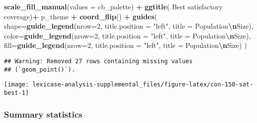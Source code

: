 \documentclass[
]{book}
\newenvironment{Shaded}{\begin{snugshade}}{\end{snugshade}}
\newcommand{\AttributeTok}[1]{\textcolor[rgb]{0.13,0.29,0.53}{#1}}
\newcommand{\DecValTok}[1]{\textcolor[rgb]{0.00,0.00,0.81}{#1}}
\newcommand{\FunctionTok}[1]{\textcolor[rgb]{0.13,0.29,0.53}{\textbf{#1}}}
\newcommand{\NormalTok}[1]{#1}
\newcommand{\SpecialCharTok}[1]{\textcolor[rgb]{0.81,0.36,0.00}{\textbf{#1}}}
\newcommand{\StringTok}[1]{\textcolor[rgb]{0.31,0.60,0.02}{#1}}
\begin{document}
\begin{Shaded}
\begin{Highlighting}[]
  \FunctionTok{scale\_fill\_manual}\NormalTok{(}\AttributeTok{values =}\NormalTok{ cb\_palette) }\SpecialCharTok{+}
  \FunctionTok{ggtitle}\NormalTok{(}\StringTok{\textquotesingle{}  Best satisfactory coverage\textquotesingle{}}\NormalTok{)}\SpecialCharTok{+}
\NormalTok{  p\_theme }\SpecialCharTok{+} \FunctionTok{coord\_flip}\NormalTok{() }\SpecialCharTok{+}
  \FunctionTok{guides}\NormalTok{(}
    \AttributeTok{shape=}\FunctionTok{guide\_legend}\NormalTok{(}\AttributeTok{nrow=}\DecValTok{2}\NormalTok{, }\AttributeTok{title.position =} \StringTok{"left"}\NormalTok{, }\AttributeTok{title =} \StringTok{\textquotesingle{}Population}\SpecialCharTok{\textbackslash{}n}\StringTok{Size\textquotesingle{}}\NormalTok{),}
    \AttributeTok{color=}\FunctionTok{guide\_legend}\NormalTok{(}\AttributeTok{nrow=}\DecValTok{2}\NormalTok{, }\AttributeTok{title.position =} \StringTok{"left"}\NormalTok{, }\AttributeTok{title =} \StringTok{\textquotesingle{}Population}\SpecialCharTok{\textbackslash{}n}\StringTok{Size\textquotesingle{}}\NormalTok{),}
    \AttributeTok{fill=}\FunctionTok{guide\_legend}\NormalTok{(}\AttributeTok{nrow=}\DecValTok{2}\NormalTok{, }\AttributeTok{title.position =} \StringTok{"left"}\NormalTok{, }\AttributeTok{title =} \StringTok{\textquotesingle{}Population}\SpecialCharTok{\textbackslash{}n}\StringTok{Size\textquotesingle{}}\NormalTok{)}
\NormalTok{  )}
\end{Highlighting}
\end{Shaded}

\begin{verbatim}
## Warning: Removed 27 rows containing missing values
## (`geom_point()`).
\end{verbatim}

\texttt{[image: lexicase-analysis-supplemental\_files/figure-latex/con-150-sat-best-1]}

\hypertarget{summary-statistics-2}{%
\subsubsection{Summary statistics}\label{summary-statistics-2}}
\end{document}

